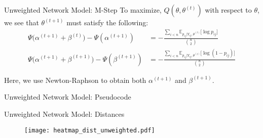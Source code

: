 \documentclass{beamer}
\begin{document}
\begin{frame}{Unweighted Network Model: M-Step}
To maximize, $Q(\theta, \theta^{(t)})$ with respect to $\theta$, we see that $\theta^{(t+1)}$ must satisfy the following:
\begin{align*}
\Psi\Big(\alpha^{(t+1)} + \beta^{(t)}\Big) - \Psi(\alpha^{(t+1)}) &= -\frac{\sum_{i<n}\mathbb{E}_{p_{ij} | Y_{ij}, \theta^{(t)}} \big[\log p_{ij}\big]}{{n \choose 2}} \tag{$\alpha_U$}\\
\Psi\Big(\alpha^{(t+1)} + \beta^{(t+1)}\Big) - \Psi(\beta^{(t+1)}) &= -\frac{\sum_{i<n}\mathbb{E}_{p_{ij} | Y_{ij}, \theta^{(t)}} \big[\log (1 - p_{ij})\big]}{{n \choose 2}} \tag{$\beta_U$}
\end{align*}

Here, we use Newton-Raphson to obtain both $\alpha^{(t+1)}$ and $\beta^{(t+1)}$.
\end{frame}

\begin{frame}{Unweighted Network Model: Pseudocode}
\begin{center}
\end{center}
\end{frame}

\begin{frame}{Unweighted Network Model: Distances}
\begin{figure}
    \centering
    \texttt{[image: heatmap\_dist\_unweighted.pdf]}
    \end{figure}
\end{frame}
\end{document}

